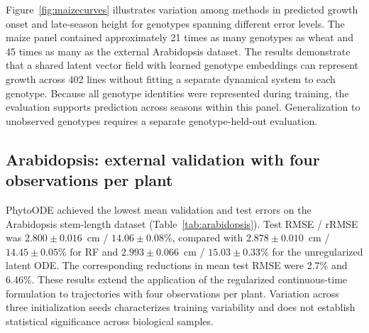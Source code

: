 \documentclass[preprint,12pt,authoryear]{elsarticle}
\newcommand{\model}{PhytoODE}
\begin{document}
Figure~\ref{fig:maizecurves} illustrates variation among methods in predicted growth onset and late-season height for genotypes spanning different error levels. The maize panel contained approximately 21 times as many genotypes as wheat and 45 times as many as the external Arabidopsis dataset. The results demonstrate that a shared latent vector field with learned genotype embeddings can represent growth across 402 lines without fitting a separate dynamical system to each genotype. Because all genotype identities were represented during training, the evaluation supports prediction across seasons within this panel. Generalization to unobserved genotypes requires a separate genotype-held-out evaluation.

\subsection{Arabidopsis: external validation with four observations per plant}
\label{subsec:arabresults}

\model{} achieved the lowest mean validation and test errors on the Arabidopsis stem-length dataset (Table~\ref{tab:arabidopsis}). Test RMSE / rRMSE was $2.800\pm0.016$~cm / $14.06\pm0.08\%$, compared with $2.878\pm0.010$~cm / $14.45\pm0.05\%$ for RF and $2.993\pm0.066$~cm / $15.03\pm0.33\%$ for the unregularized latent ODE. The corresponding reductions in mean test RMSE were 2.7\% and 6.46\%. These results extend the application of the regularized continuous-time formulation to trajectories with four observations per plant. Variation across three initialization seeds characterizes training variability and does not establish statistical significance across biological samples.
\end{document}
